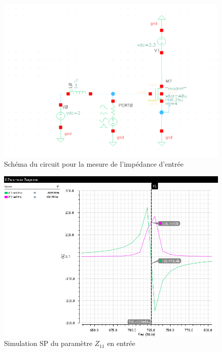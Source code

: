 \documentclass[a4paper]{article}
\begin{document}
\begin{figure}[!htb]
\begin{center}
  \includegraphics[scale=0.40]{arch-transistor-input-impedance.png}
  \caption{Sch\'ema du circuit pour la mesure de l'imp\'edance d'entr\'ee}
\end{center}
\end{figure}

\begin{figure}[!htb]
\begin{center}
  \includegraphics[scale=0.40]{sim-input-impedance.png}
  \caption{Simulation SP du param\`etre $Z_11$ en entr\'ee}
\end{center}
\end{figure}
\end{document}
